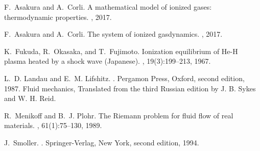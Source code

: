 \documentclass[10pt,a4paper]{article}
\numberwithin{equation}{section}
\begin{document}

\begin{thebibliography}{1}

F.~Asakura and A.~Corli.
\newblock A mathematical model of ionized gases: thermodynamic properties.
, 2017.

F.~Asakura and A.~Corli.
\newblock The system of ionized gasdynamics.
, 2017.

K.~Fukuda, R.~Okasaka, and T.~Fujimoto.
\newblock Ionization equilibrium of {H}e-{H} plasma heated by a shock wave
  ({J}apanese).
, 19(3):199--213,
  1967.

L.~D. Landau and E.~M. Lifshitz.
.
\newblock Pergamon Press, Oxford, second edition, 1987.
\newblock Fluid mechanics, Translated from the third Russian edition by J. B.
  Sykes and W. H. Reid.

R.~Menikoff and B.~J. Plohr.
\newblock The {R}iemann problem for fluid flow of real materials.
, 61(1):75--130, 1989.

J.~Smoller.
.
\newblock Springer-Verlag, New York, second edition, 1994.

\end{thebibliography}

%
%
\end{document}
